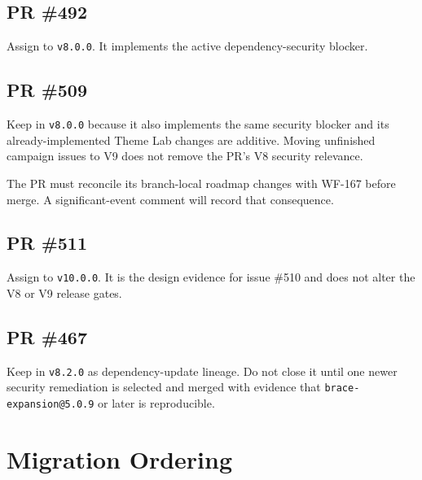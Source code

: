 \subsection{PR \#492}\label{record-249-pr-492}

Assign to \texttt{v\allowbreak{}8\allowbreak{}.\allowbreak{}0\allowbreak{}.\allowbreak{}0}. It implements the active dependency-security blocker.

\subsection{PR \#509}\label{record-249-pr-509}

Keep in \texttt{v\allowbreak{}8\allowbreak{}.\allowbreak{}0\allowbreak{}.\allowbreak{}0} because it also implements the same security blocker and its already-implemented Theme Lab changes are additive. Moving unfinished campaign issues to V9 does not remove the PR's V8 security relevance.

The PR must reconcile its branch-local roadmap changes with WF-167 before merge. A significant-event comment will record that consequence.

\subsection{PR \#511}\label{record-249-pr-511}

Assign to \texttt{v\allowbreak{}1\allowbreak{}0\allowbreak{}.\allowbreak{}0\allowbreak{}.\allowbreak{}0}. It is the design evidence for issue \#510 and does not alter the V8 or V9 release gates.

\subsection{PR \#467}\label{record-249-pr-467}

Keep in \texttt{v\allowbreak{}8\allowbreak{}.\allowbreak{}2\allowbreak{}.\allowbreak{}0} as dependency-update lineage. Do not close it until one newer security remediation is selected and merged with evidence that \texttt{b\allowbreak{}r\allowbreak{}a\allowbreak{}c\allowbreak{}e\allowbreak{}-\allowbreak{}e\allowbreak{}x\allowbreak{}p\allowbreak{}a\allowbreak{}n\allowbreak{}s\allowbreak{}i\allowbreak{}o\allowbreak{}n\allowbreak{}@\allowbreak{}5\allowbreak{}.\allowbreak{}0\allowbreak{}.\allowbreak{}9} or later is reproducible.

\section{Migration Ordering}\label{record-249-migration-ordering}

